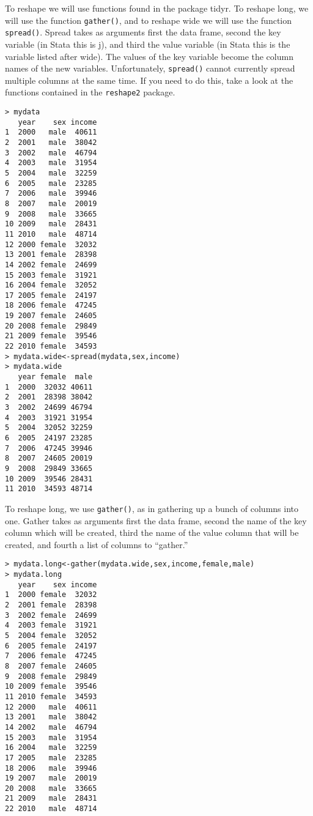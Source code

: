 \documentclass[12pt, oneside]{amsart}   	%
\begin{document}
To reshape we will use functions found in the package tidyr. To reshape long, we will use the function \texttt{gather()}, and to reshape wide we will use the function \texttt{spread()}. Spread takes as arguments first the data frame, second the key variable (in Stata this is j), and third the value variable (in Stata this is the variable listed after wide). The values of the key variable become the column names of the new variables. Unfortunately, \texttt{spread()} cannot currently spread multiple columns at the same time. If you need to do this, take a look at the functions contained in the \texttt{reshape2} package.

\begin{verbatim}
> mydata
   year    sex income
1  2000   male  40611
2  2001   male  38042
3  2002   male  46794
4  2003   male  31954
5  2004   male  32259
6  2005   male  23285
7  2006   male  39946
8  2007   male  20019
9  2008   male  33665
10 2009   male  28431
11 2010   male  48714
12 2000 female  32032
13 2001 female  28398
14 2002 female  24699
15 2003 female  31921
16 2004 female  32052
17 2005 female  24197
18 2006 female  47245
19 2007 female  24605
20 2008 female  29849
21 2009 female  39546
22 2010 female  34593
> mydata.wide<-spread(mydata,sex,income)
> mydata.wide
   year female  male
1  2000  32032 40611
2  2001  28398 38042
3  2002  24699 46794
4  2003  31921 31954
5  2004  32052 32259
6  2005  24197 23285
7  2006  47245 39946
8  2007  24605 20019
9  2008  29849 33665
10 2009  39546 28431
11 2010  34593 48714
\end{verbatim}

To reshape long, we use \texttt{gather()}, as in gathering up a bunch of columns into one. Gather takes as arguments first the data frame, second the name of the key column which will be created, third the name of the value column that will be created, and fourth a list of columns to ``gather.''

\begin{verbatim}
> mydata.long<-gather(mydata.wide,sex,income,female,male)
> mydata.long
   year    sex income
1  2000 female  32032
2  2001 female  28398
3  2002 female  24699
4  2003 female  31921
5  2004 female  32052
6  2005 female  24197
7  2006 female  47245
8  2007 female  24605
9  2008 female  29849
10 2009 female  39546
11 2010 female  34593
12 2000   male  40611
13 2001   male  38042
14 2002   male  46794
15 2003   male  31954
16 2004   male  32259
17 2005   male  23285
18 2006   male  39946
19 2007   male  20019
20 2008   male  33665
21 2009   male  28431
22 2010   male  48714
\end{verbatim}
\end{document}
